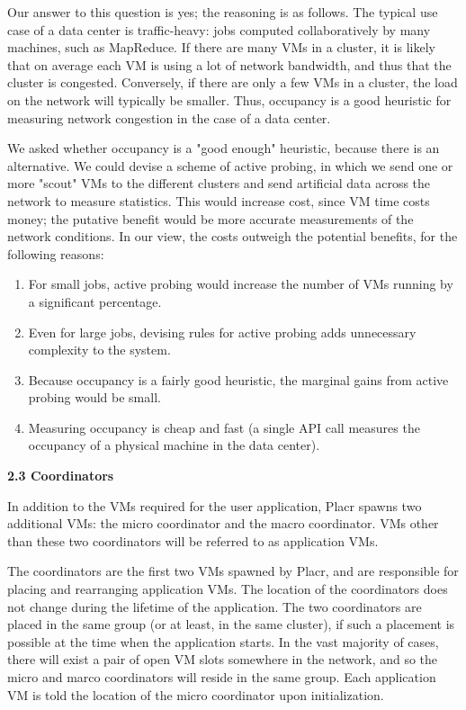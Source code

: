 \documentclass[11pt]{article}
\begin{document}
Our answer to this question is yes; the reasoning is as follows.  The typical use case of a data center is traffic-heavy: jobs computed collaboratively by many machines, such as MapReduce.  If there are many VMs in a cluster, it is likely that on average each VM is using a lot of network bandwidth, and thus that the cluster is congested.  Conversely, if there are only a few VMs in a cluster, the load on the network will typically be smaller.  Thus, occupancy is a good heuristic for measuring network congestion in the case of a data center.

We asked whether occupancy is a "good enough" heuristic, because there is an alternative.  We could devise a scheme of active probing, in which we send one or more "scout" VMs to the different clusters and send artificial data across the network to measure statistics.  This would increase cost, since VM time costs money; the putative benefit would be more accurate measurements of the network conditions.  In our view, the costs outweigh the potential benefits, for the following reasons:

\vspace{-4mm}
\begin{enumerate}
  \item For small jobs, active probing would increase the number of VMs running by a significant percentage.
  \item Even for large jobs, devising rules for active probing adds unnecessary complexity to the system.
  \item  Because occupancy is a fairly good heuristic, the marginal gains from active probing would be small.
  \item Measuring occupancy is cheap and fast (a single API call measures the occupancy of a physical machine in the data center).
\end{enumerate}	


\Large{\textbf{2.3 Coordinators}}

\normalsize

In addition to the VMs required for the user application, Placr spawns two additional VMs: the micro coordinator and the macro coordinator.  VMs other than these two coordinators will be referred to as application VMs.

The coordinators are the first two VMs spawned by Placr, and are responsible for placing and rearranging application VMs.  The location of the coordinators does not change during the lifetime of the application.  The two coordinators are placed in the same group (or at least, in the same cluster), if such a placement is possible at the time when the application starts.  In the vast majority of cases, there will exist a pair of open VM slots somewhere in the network, and so the micro and marco coordinators will reside in the same group.  Each application VM is told the location of the micro coordinator upon initialization.
\end{document}
